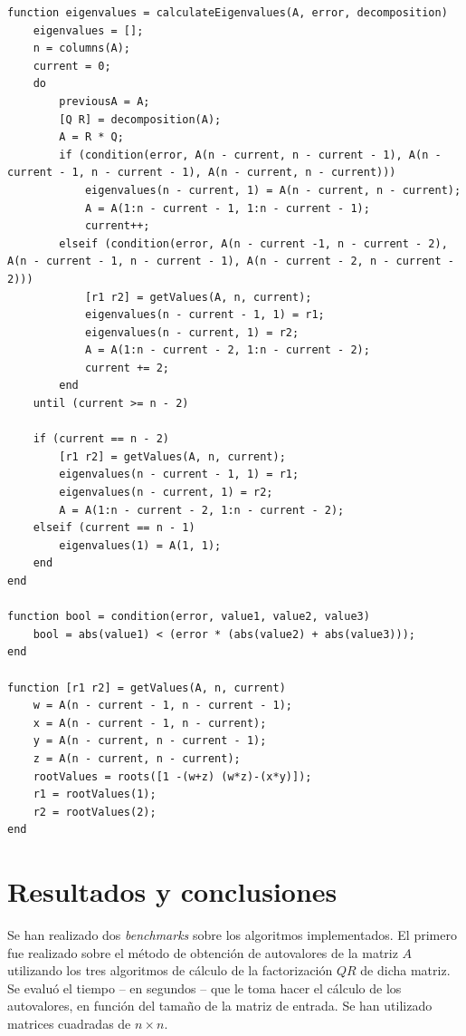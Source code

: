\documentclass[spanish]{article}
\begin{document}
            \begin{lstlisting}[caption = Implementación del método QR de obtención de autovalores]
function eigenvalues = calculateEigenvalues(A, error, decomposition)
    eigenvalues = [];
    n = columns(A);
    current = 0;
    do
        previousA = A;
        [Q R] = decomposition(A);
        A = R * Q;
        if (condition(error, A(n - current, n - current - 1), A(n - current - 1, n - current - 1), A(n - current, n - current)))
            eigenvalues(n - current, 1) = A(n - current, n - current);
            A = A(1:n - current - 1, 1:n - current - 1);
            current++;
        elseif (condition(error, A(n - current -1, n - current - 2), A(n - current - 1, n - current - 1), A(n - current - 2, n - current - 2)))
            [r1 r2] = getValues(A, n, current);
            eigenvalues(n - current - 1, 1) = r1;
            eigenvalues(n - current, 1) = r2;
            A = A(1:n - current - 2, 1:n - current - 2);
            current += 2;
        end
    until (current >= n - 2)
    
    if (current == n - 2)
        [r1 r2] = getValues(A, n, current);
        eigenvalues(n - current - 1, 1) = r1;
        eigenvalues(n - current, 1) = r2;
        A = A(1:n - current - 2, 1:n - current - 2);
    elseif (current == n - 1)
        eigenvalues(1) = A(1, 1);
    end
end
    
function bool = condition(error, value1, value2, value3)
    bool = abs(value1) < (error * (abs(value2) + abs(value3)));
end
    
function [r1 r2] = getValues(A, n, current)
    w = A(n - current - 1, n - current - 1);
    x = A(n - current - 1, n - current);
    y = A(n - current, n - current - 1);
    z = A(n - current, n - current);
    rootValues = roots([1 -(w+z) (w*z)-(x*y)]);
    r1 = rootValues(1);
    r2 = rootValues(2);
end
            \end{lstlisting}
        
    \section{Resultados y conclusiones}
    
    \par Se han realizado dos \textit{benchmarks} sobre los algoritmos implementados. El primero fue realizado sobre el método de obtención de autovalores de la matriz $A$ utilizando los tres algoritmos de cálculo de la factorización $QR$ de dicha matriz. Se evaluó el tiempo – en segundos – que le toma hacer el cálculo de los autovalores, en función del tamaño de la matriz de entrada. Se han utilizado matrices cuadradas de $n \times n$.
    
\end{document}
